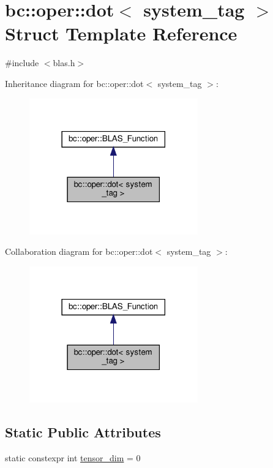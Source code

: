 \hypertarget{structbc_1_1oper_1_1dot}{}\section{bc\+:\+:oper\+:\+:dot$<$ system\+\_\+tag $>$ Struct Template Reference}
\label{structbc_1_1oper_1_1dot}


{\ttfamily \#include $<$blas.\+h$>$}



Inheritance diagram for bc\+:\+:oper\+:\+:dot$<$ system\+\_\+tag $>$\+:\nopagebreak
\begin{figure}[H]
\begin{center}
\leavevmode
\includegraphics[width=206pt]{structbc_1_1oper_1_1dot__inherit__graph}
\end{center}
\end{figure}


Collaboration diagram for bc\+:\+:oper\+:\+:dot$<$ system\+\_\+tag $>$\+:\nopagebreak
\begin{figure}[H]
\begin{center}
\leavevmode
\includegraphics[width=206pt]{structbc_1_1oper_1_1dot__coll__graph}
\end{center}
\end{figure}
\subsection*{Static Public Attributes}
\begin{DoxyCompactItemize}
\item 
static constexpr int \hyperlink{structbc_1_1oper_1_1dot_aedafe970f0b974b7ef44c445bca5d710}{tensor\+\_\+dim} = 0
\end{DoxyCompactItemize}
